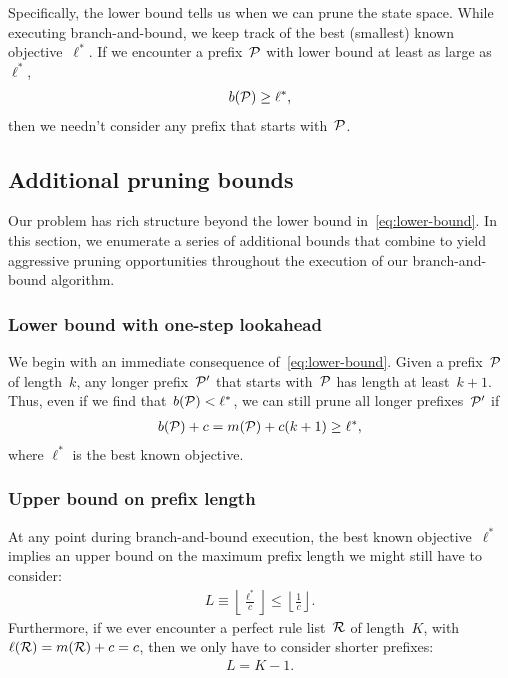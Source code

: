 Specifically, the lower bound tells us when we can prune the state space.
%
While executing branch-and-bound, we keep track of the best (smallest) known objective~$\ell^*$.
%
If we encounter a prefix~${\mathcal P}$ with lower bound at least as large as~$\ell^*$,
\begin{align}
b(\Prefix) \ge \ell^*,
\end{align}
then we needn't consider any prefix that starts with~${\mathcal P}$.

\subsection{Additional pruning bounds}

Our problem has rich structure beyond the lower bound in~\eqref{eq:lower-bound}.
%
In this section, we enumerate a series of additional bounds that combine to yield
aggressive pruning opportunities throughout the execution of our branch-and-bound algorithm.

\subsubsection{Lower bound with one-step lookahead}

We begin with an immediate consequence of~\eqref{eq:lower-bound}.
%
Given a prefix~${\mathcal P}$ of length~$k$, any longer prefix~${\mathcal P}'$ that starts
with~${\mathcal P}$ has length at least~${k+1}$.
%
Thus, even if we find that~${b({\mathcal P}) < \ell^*}$, we can still prune all longer
prefixes~${\mathcal P}'$ if
\begin{align}
b(\Prefix) + c = m(\Prefix) + c (k + 1) \ge \ell^*,
\end{align}
where $\ell^*$ is the best known objective.

\subsubsection{Upper bound on prefix length}

At any point during branch-and-bound execution, the best known objective~$\ell^*$
implies an upper bound on the maximum prefix length we might still have to consider:
\begin{align}
L \equiv \left\lfloor \frac{\ell^*}{c} \right\rfloor \le \left\lfloor \frac{1}{c} \right\rfloor.
\end{align}
Furthermore, if we ever encounter a perfect rule list~${\mathcal R}$ of length~$K$,
\ie with~${\ell({\mathcal R}) = m({\mathcal R}) + c = c}$, then we only have to consider shorter prefixes:
\begin{align}
L = K - 1.
\end{align}


